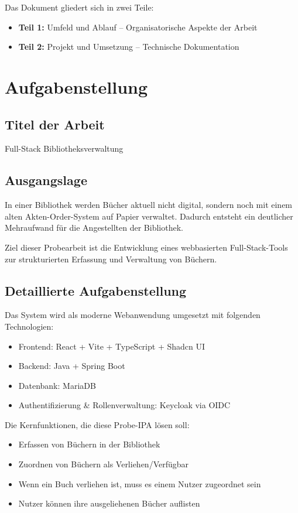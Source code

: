 \documentclass[a4paper,12pt,twoside]{report}
\begin{document}
Das Dokument gliedert sich in zwei Teile:
\begin{itemize}
    \item \textbf{Teil 1:} Umfeld und Ablauf -- Organisatorische Aspekte der Arbeit
    \item \textbf{Teil 2:} Projekt und Umsetzung -- Technische Dokumentation
\end{itemize}

\newpage

\section{Aufgabenstellung}

\subsection{Titel der Arbeit}
Full-Stack Bibliotheksverwaltung

\subsection{Ausgangslage}
In einer Bibliothek werden Bücher aktuell nicht digital, sondern noch mit einem alten Akten-Order-System auf Papier verwaltet. Dadurch entsteht ein deutlicher Mehraufwand für die Angestellten der Bibliothek.

Ziel dieser Probearbeit ist die Entwicklung eines webbasierten Full-Stack-Tools zur strukturierten Erfassung und Verwaltung von Büchern.

\subsection{Detaillierte Aufgabenstellung}
Das System wird als moderne Webanwendung umgesetzt mit folgenden Technologien:
\begin{itemize}
    \item Frontend: React + Vite + TypeScript + Shadcn UI
    \item Backend: Java + Spring Boot
    \item Datenbank: MariaDB
    \item Authentifizierung \& Rollenverwaltung: Keycloak via OIDC
\end{itemize}

Die Kernfunktionen, die diese Probe-IPA lösen soll:
\begin{itemize}
    \item Erfassen von Büchern in der Bibliothek
    \item Zuordnen von Büchern als Verliehen/Verfügbar
    \item Wenn ein Buch verliehen ist, muss es einem Nutzer zugeordnet sein
    \item Nutzer können ihre ausgeliehenen Bücher auflisten
\end{itemize}
\end{document}
